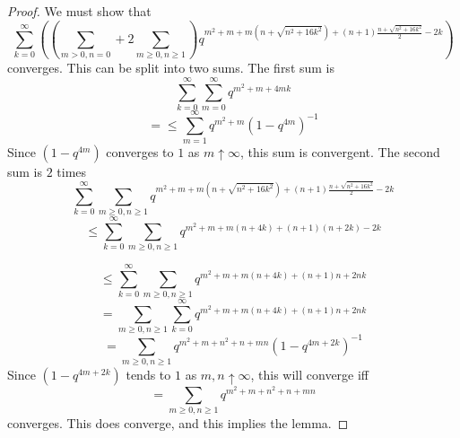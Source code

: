 \documentclass[10pt,a4paper]{amsart}
\begin{document}
\begin{proof} We must show that
$$\sum_{k=0}^{\infty}\left((\sum_{m>0,n=0}+2\sum_{m\ge 0,n\ge 1})
q^{m^2+m+m(n+\sqrt{n^2+16k^2})+(n+1)\frac{n+\sqrt{n^2+16k^2}}{2}-2k}\right)$$
converges. This can be split into two sums. The first sum is
$$\sum_{k=0}^{\infty}\sum_{m=0}^{\infty}
q^{m^2+m+4mk}$$
$$=\le \sum_{m=1}^{\infty}q^{m^2+m}(1-q^{4m})^{-1}$$
Since $(1-q^{4m})$ converges to $1$ as $m\uparrow \infty$, this sum is convergent.
The second sum is $2$ times
$$\sum_{k=0}^{\infty}\sum_{m\ge 0,n\ge 1}
q^{m^2+m+m(n+\sqrt{n^2+16k^2})+(n+1)\frac{n+\sqrt{n^2+16k^2}}{2}-2k}$$
$$\le \sum_{k=0}^{\infty}\sum_{m\ge 0,n\ge 1}
q^{m^2+m+m(n+4k)+(n+1)(n+2k)-2k}$$

$$\le \sum_{k=0}^{\infty}\sum_{m\ge 0,n\ge 1}
q^{m^2+m+m(n+4k)+(n+1)n+2nk}$$
$$=\sum_{m\ge 0,n\ge 1} \sum_{k=0}^{\infty}
q^{m^2+m+m(n+4k)+(n+1)n+2nk}$$
$$=\sum_{m\ge 0,n\ge 1}
q^{m^2+m+n^2+n+mn}(1-q^{4m+2k})^{-1}$$
Since $(1-q^{4m+2k})$ tends to $1$ as $m,n\uparrow \infty$, this will converge
iff
$$=\sum_{m\ge 0,n\ge 1}
q^{m^2+m+n^2+n+mn}$$
converges. This does converge, and this implies the lemma.

\end{proof}
\end{document}
